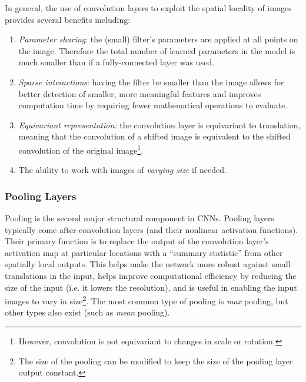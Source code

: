 In general, the use of convolution layers to exploit the spatial locality of images provides several benefits including:
\begin{enumerate}
    \item \textit{Parameter sharing}: the (small) filter's parameters are applied at all points on the image. Therefore the total number of learned parameters in the model is much smaller than if a fully-connected layer was used.
    \item \textit{Sparse interactions}: having the filter be smaller than the image allows for better detection of smaller, more meaningful features and improves computation time by requiring fewer mathematical operations to evaluate.
    \item \textit{Equivariant representation:} the convolution layer is equivariant to translation, meaning that the convolution of a shifted image is equivalent to the shifted convolution of the original image\footnote{However, convolution is not equivariant to changes in scale or rotation.}.
    \item The ability to work with images of \textit{varying size} if needed.
\end{enumerate}


\subsubsection{Pooling Layers}
Pooling is the second major structural component in CNNs. Pooling layers typically come after convolution layers (and their nonlinear activation functions). Their primary function is to replace the output of the convolution layer's activation map at particular locations with a ``summary statistic'' from other spatially local outputs. This helps make the network more robust against small translations in the input, helps improve computational efficiency by reducing the size of the input (i.e. it lowers the resolution), and is useful in enabling the input images to vary in size\footnote[][-2\baselineskip]{The size of the pooling can be modified to keep the size of the pooling layer output constant.}. The most common type of pooling is \textit{max} pooling, but other types also exist (such as \textit{mean} pooling). 

